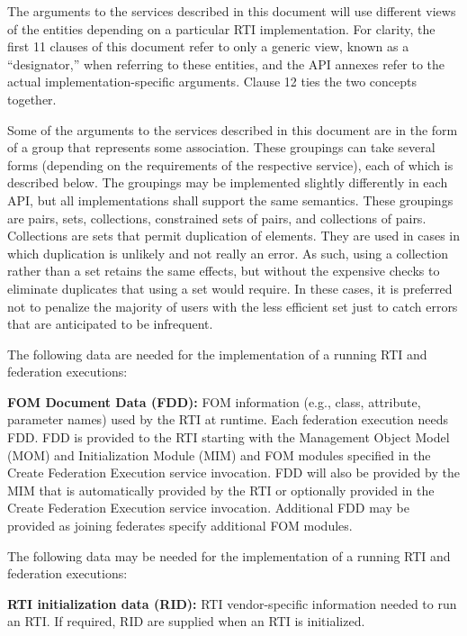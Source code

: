 The arguments to the services described in this document will use different views of the entities depending on a particular RTI implementation. For clarity, the first 11 clauses of this document refer to only a generic view, known as a ``designator,'' when referring to these entities, and the API annexes refer to the actual implementation-specific arguments. Clause 12 ties the two concepts together.

Some of the arguments to the services described in this document are in the form of a group that represents some association. These groupings can take several forms (depending on the requirements of the respective service), each of which is described below. The groupings may be implemented slightly differently in each API, but all implementations shall support the same semantics. These groupings are pairs, sets, collections, constrained sets of pairs, and collections of pairs. Collections are sets that permit duplication of elements. They are used in cases in which duplication is unlikely and not really an error. As such, using a collection rather than a set retains the same effects, but without the expensive checks to eliminate duplicates that using a set would require. In these cases, it is preferred not to penalize the majority of users with the less efficient set just to catch errors that are anticipated to be infrequent.

\clearpage
The following data are needed for the implementation of a running RTI and federation executions:

\begin{stddashlist}
    \item \textbf{FOM Document Data (FDD):} FOM information (e.g., class, attribute, parameter names) used by the RTI at runtime. Each federation execution needs FDD. FDD is provided to the RTI starting with the Management Object Model (MOM) and Initialization Module (MIM) and FOM modules specified in the Create Federation Execution service invocation. FDD will also be provided by the MIM that is automatically provided by the RTI or optionally provided in the Create Federation Execution service invocation. Additional FDD may be provided as joining federates specify additional FOM modules.
\end{stddashlist}

The following data may be needed for the implementation of a running RTI and federation executions:

\begin{stddashlist}
    \item \textbf{RTI initialization data (RID):} RTI vendor-specific information needed to run an RTI. If required, RID are supplied when an RTI is initialized.
\end{stddashlist}

